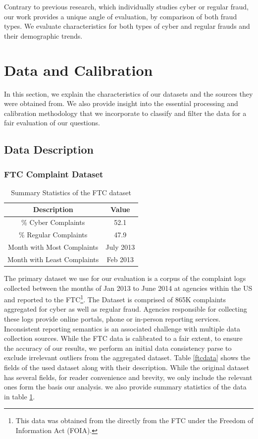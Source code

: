 \documentclass[conference]{IEEEtran}
\begin{document}
Contrary to previous research, which individually studies cyber or regular fraud, our work provides a unique angle of evaluation, by comparison of both fraud types. We evaluate characteristics for both types of cyber and regular frauds and their demographic trends.
\section{Data and Calibration} \label{data-cal}

In this section, we explain the characteristics of our datasets and the sources they were obtained from. We also provide insight into the essential processing and calibration methodology that we incorporate to classify and filter the data for a fair evaluation of our questions.


\subsection{Data Description}

\subsubsection{FTC Complaint Dataset}

\begin{table}[h]
\centering
\begin{tabular}{c|c}
\hline
{\bfseries Description} & \multicolumn{1}{c}{\bfseries Value}
\\
\hline
\hline
\% Cyber Complaints &52.1\\
\hline
\% Regular Complaints & 47.9\\
\hline
Month with Most Complaints & July 2013\\
\hline
Month with Least Complaints & Feb 2013\\
\hline
\end{tabular}
\vspace{8pt}
\caption{Summary Statistics of the FTC dataset}\label{summary_stats}
\vspace{-10pt}
\end{table}


The primary dataset we use for our evaluation is a corpus of the complaint logs collected between the months of Jan 2013 to June 2014 at agencies within the US and reported to the FTC\footnote{This data was obtained from the directly from the FTC under the Freedom of Information Act (FOIA).}. The Dataset is comprised of 865K complaints aggregated for cyber as well as regular fraud. Agencies responsible for collecting these logs provide online portals, phone or in-person reporting services. Inconsistent reporting semantics is an associated challenge with multiple data collection sources. While the FTC data is calibrated to a fair extent, to ensure the accuracy of our results, we perform an initial data consistency parse to exclude irrelevant outliers from the aggregated dataset. Table \ref{ftcdata} shows the fields of the used dataset along with their description. While the original dataset has several fields, for reader convenience and brevity, we only include the relevant ones form the basis our analysis. we also provide summary statistics of the data in table \ref{summary_stats}.
\\
\end{document}
